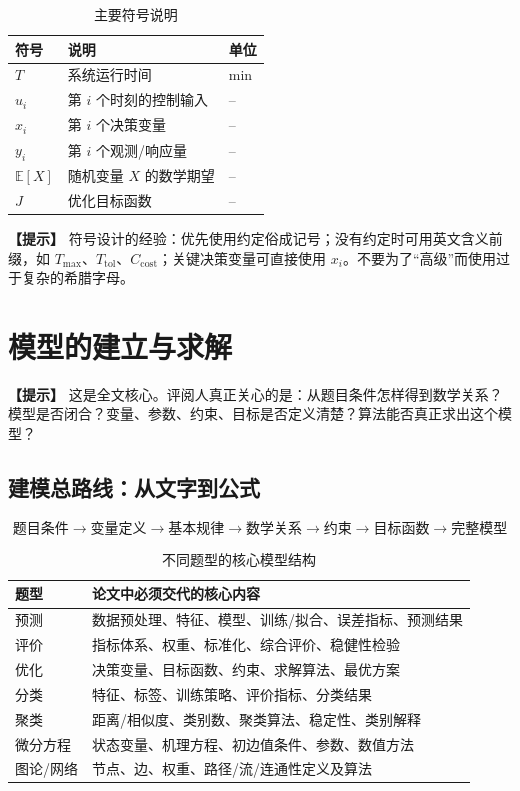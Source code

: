 \documentclass[12pt,a4paper]{article}
\newcommand{\tip}[1]{\par\noindent\textbf{【提示】} #1\par}
\begin{document}
\begin{table}[H]
\centering
\caption{主要符号说明}
\label{tab:symbol}
\begin{tabular}{p{3cm}p{8cm}p{2cm}}
\toprule
符号 & 说明 & 单位\\
\midrule
$T$ & 系统运行时间 & min\\
$u_i$ & 第 $i$ 个时刻的控制输入 & --\\
$x_i$ & 第 $i$ 个决策变量 & --\\
$y_i$ & 第 $i$ 个观测/响应量 & --\\
$\mathbb{E}[X]$ & 随机变量 $X$ 的数学期望 & --\\
$J$ & 优化目标函数 & --\\
\bottomrule
\end{tabular}
\end{table}

\tip{符号设计的经验：优先使用约定俗成记号；没有约定时可用英文含义前缀，如 $T_{\max}$、$T_{\mathrm{tol}}$、$C_{\mathrm{cost}}$；关键决策变量可直接使用 $x_i$。不要为了“高级”而使用过于复杂的希腊字母。}

\section{模型的建立与求解}

\tip{这是全文核心。评阅人真正关心的是：从题目条件怎样得到数学关系？模型是否闭合？变量、参数、约束、目标是否定义清楚？算法能否真正求出这个模型？}

\subsection{建模总路线：从文字到公式}

\[
\boxed{
\text{题目条件}
\rightarrow
\text{变量定义}
\rightarrow
\text{基本规律}
\rightarrow
\text{数学关系}
\rightarrow
\text{约束}
\rightarrow
\text{目标函数}
\rightarrow
\text{完整模型}
}
\]

\begin{table}[H]
\centering
\caption{不同题型的核心模型结构}
\begin{tabular}{p{3cm}p{11cm}}
\toprule
题型 & 论文中必须交代的核心内容 \\
\midrule
预测 & 数据预处理、特征、模型、训练/拟合、误差指标、预测结果 \\
评价 & 指标体系、权重、标准化、综合评价、稳健性检验 \\
优化 & 决策变量、目标函数、约束、求解算法、最优方案 \\
分类 & 特征、标签、训练策略、评价指标、分类结果 \\
聚类 & 距离/相似度、类别数、聚类算法、稳定性、类别解释 \\
微分方程 & 状态变量、机理方程、初边值条件、参数、数值方法 \\
图论/网络 & 节点、边、权重、路径/流/连通性定义及算法 \\
\bottomrule
\end{tabular}
\end{table}
\end{document}

